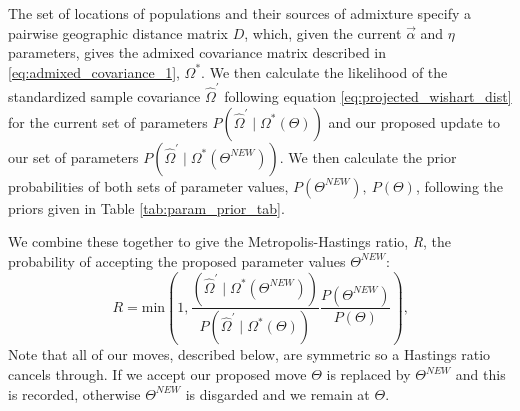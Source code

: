 \documentclass[12pt]{article}
\newcommand{\identifyadmixsource}[1]{{#1^{*}}}
\begin{document}
The set of locations of populations and their sources of admixture specify a pairwise geographic distance matrix $D$, which, given the current $\vec{\alpha}$ and $\eta$ parameters, gives the admixed covariance matrix described in \eqref{eq:admixed_covariance_1}, $\identifyadmixsource{\Omega}$.  We then calculate the likelihood of the standardized sample covariance $\widehat{\Omega}^{\prime}$ following equation \eqref{eq:projected_wishart_dist} for the current set of parameters $P(\widehat{\Omega}^{\prime} \mid \identifyadmixsource{\Omega}(\Theta))$ and our proposed update to our set of parameters $P(\widehat{\Omega}^{\prime} \mid \identifyadmixsource{\Omega}(\Theta^{NEW}))$. We then calculate the prior probabilities of both sets of parameter values, $P(\Theta^{NEW}),~P(\Theta) $, following the priors given in Table \ref{tab:param_prior_tab}.




We combine these together to give the Metropolis-Hastings ratio, \emph{R}, the probability of accepting the proposed parameter values $\Theta^{NEW}$:
\begin{equation}
R = \text{min}\left(1, \frac{(\widehat{\Omega}^{\prime} \mid \identifyadmixsource{\Omega}(\Theta^{NEW}))} {P(\widehat{\Omega}^{\prime} \mid \identifyadmixsource{\Omega}(\Theta))} 
				\frac{P(\Theta^{NEW})}{P(\Theta)} 	\right) \text{,}
\label{eq:MH_algorithm}
\end{equation}
Note that all of our moves, described below, are symmetric so a Hastings ratio cancels through. If we accept our proposed move $\Theta$ is replaced by $\Theta^{NEW}$ and this is recorded, otherwise $\Theta^{NEW}$ is disgarded and we remain at $\Theta$. 


\end{document}
